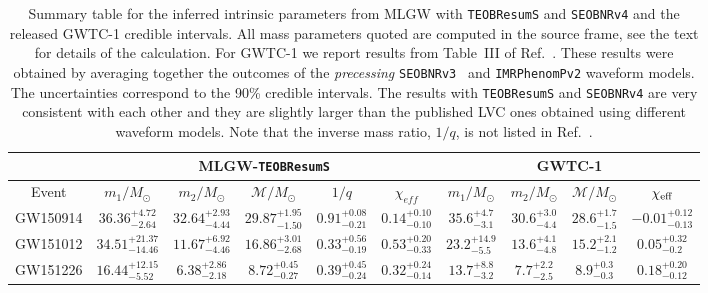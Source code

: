 \begin{table}
\centering
\caption{Summary table for the inferred intrinsic parameters from MLGW with {\tt TEOBResumS} and \texttt{SEOBNRv4} and the released GWTC-1 credible intervals. 
All mass parameters quoted are computed in the source frame, see the text for details of the calculation. For GWTC-1 we report results from Table~III  of Ref.~\cite{LIGOScientific:2018mvr}. These results were obtained by averaging together the outcomes of the 
{\it precessing} {\tt SEOBNRv3}~\cite{Babak:2016tgq} and {\tt IMRPhenomPv2} waveform models. 
The uncertainties correspond to the 90\% credible intervals.
The results with  {\tt TEOBResumS} and  {\tt SEOBNRv4} are very consistent with each other and they are
slightly larger than the published LVC ones obtained using different waveform models.
Note that the inverse mass ratio, $1/q$, is not listed in Ref.~\cite{LIGOScientific:2018mvr}.}
\label{tab:summary}
\begin{ruledtabular}
\iffalse
\begin{tabular}{cccccccccc}
                              & \multicolumn{5}{c}{MLGW-{\tt TEOBResumS}}                                                   & \multicolumn{4}{c|}{GWTC-1}                                                \\ 
                              \hline
Event    & $m_1/M_\odot$ & $m_2/M_\odot$ & $\mathcal{M}/M_\odot$ & $1/q$ & $\chi_{eff}$ & $m_1/M_\odot$ & $m_2/M_\odot$ & $\mathcal{M}/M_\odot$ & $\chi_{\rm eff}$
\\ \hline
\vspace{1.0 mm}
GW150914 & $36.36_{-2.64}^{+4.72}$& $32.64_{-4.44}^{+2.93}$& $29.87_{-1.50}^{+1.95}$& $0.91_{-0.21}^{+0.08}$& $0.14_{-0.10}^{+0.10}$& $35.6_{-3.1}^{+4.7}$&   $30.6_{-4.4}^{+3.0}$& $28.6_{-1.5}^{+1.7}$& $-0.01_{-0.13}^{+0.12}$\\
\vspace{1.0 mm}
GW151012 & $34.51_{-14.46}^{+21.37}$& $11.67_{-4.46}^{+6.92}$& $16.86_{-2.68}^{+3.01}$& $0.33_{-0.19}^{+0.56}$& $0.53_{-0.33}^{+0.20}$&   $23.2_{-5.5}^{+14.9}$            &   $13.6_{-4.8}^{+4.1}$            &  $15.2_{-1.2}^{+2.1}$                     &  $0.05_{-0.2}^{+0.32}$              \\
\vspace{1.0 mm}
GW151226 & $16.44_{-5.52}^{+12.15}$& $6.38_{-2.18}^{+2.86}$& $8.72_{-0.27}^{+0.45}$& $0.39_{-0.24}^{+0.45}$& $0.32_{-0.14}^{+0.24}$&   $13.7_{-3.2}^{+8.8}$            & $7.7_{-2.5}^{+2.2}$               &  $8.9_{-0.3}^{+0.3}$                     & $0.18_{-0.12}^{+0.20}$              \\

\end{tabular}
\end{ruledtabular}
\end{table}
